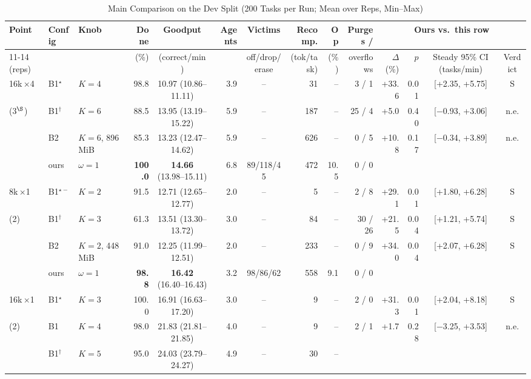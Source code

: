 \documentclass[conference]{IEEEtran}
\newcommand{\x}{$\times$}
\newcommand{\pick}{$^\star$}
\newcommand{\pickf}{$^{\star-}$}
\newcommand{\topk}{$^\dagger$}
\newcommand{\late}{$^\S$}
\begin{document}
\begin{table}[!t]
  \caption{Main Comparison on the Dev Split (200 Tasks per Run; Mean over Reps, Min--Max)}
  \label{tab:main}
  \centering
  \scriptsize
  \setlength{\tabcolsep}{3.2pt}
  \renewcommand{\arraystretch}{0.9}
  \begin{tabular}{@{}lllrcrcrrrrrcc@{}}
    \toprule
    Point & Config & Knob & Done & Goodput & Agents & Victims & Recomp. & Op & Purges / &
      \multicolumn{4}{c}{Ours vs.\ this row} \\
    \cmidrule(l){11-14}
     (reps) & & & (\%) & (correct/min) & & off/drop/erase & (tok/task) & (\%) & overflows
      & $\Delta$ (\%) & $p$ & Steady 95\% CI (tasks/min) & Verdict \\
    \midrule
    16k\,\x4 & B1\pick & $K{=}4$ & 98.8 & 10.97 (10.86--11.11) & 3.9 & -- & 31 & -- & 3 / 1 &
      +33.6 & 0.01 & [+2.35, +5.75] & S \\
    (3\late) & B1\topk & $K{=}6$ & 88.5 & 13.95 (13.19--15.22) & 5.9 & -- & 187 & -- & 25 / 4 &
      +5.0 & 0.40 & [$-$0.93, +3.06] & n.e. \\
     & B2 & $K{=}6$, 896\,MiB & 85.3 & 13.23 (12.47--14.62) & 5.9 & -- & 626 & -- & 0 / 5 &
      +10.8 & 0.17 & [$-$0.34, +3.89] & n.e. \\
     & ours & $\omega{=}1$ & \textbf{100.0} & \textbf{14.66} (13.98--15.11) & 6.8 &
      89/118/45 & 472 & 10.5 & 0 / 0 & & & & \\
    \midrule
    8k\,\x1 & B1\pickf & $K{=}2$ & 91.5 & 12.71 (12.65--12.77) & 2.0 & -- & 5 & -- & 2 / 8 &
      +29.1 & 0.01 & [+1.80, +6.28] & S \\
    (2) & B1\topk & $K{=}3$ & 61.3 & 13.51 (13.30--13.72) & 3.0 & -- & 84 & -- & 30 / 26 &
      +21.5 & 0.04 & [+1.21, +5.74] & S \\
     & B2 & $K{=}2$, 448\,MiB & 91.0 & 12.25 (11.99--12.51) & 2.0 & -- & 233 & -- & 0 / 9 &
      +34.0 & 0.04 & [+2.07, +6.28] & S \\
     & ours & $\omega{=}1$ & \textbf{98.8} & \textbf{16.42} (16.40--16.43) & 3.2 & 98/86/62 &
      558 & 9.1 & 0 / 0 & & & & \\
    \midrule
    16k\,\x1 & B1\pick & $K{=}3$ & 100.0 & 16.91 (16.63--17.20) & 3.0 & -- & 9 & -- & 2 / 0 &
      +31.3 & 0.01 & [+2.04, +8.18] & S \\
    (2) & B1 & $K{=}4$ & 98.0 & 21.83 (21.81--21.85) & 4.0 & -- & 9 & -- & 2 / 1 &
      +1.7 & 0.28 & [$-$3.25, +3.53] & n.e. \\
     & B1\topk & $K{=}5$ & 95.0 & 24.03 (23.79--24.27) & 4.9 & -- & 30 & -- &

\end{tabular}
\end{table}
\end{document}
